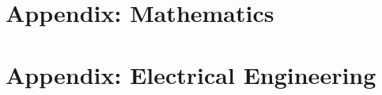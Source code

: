 \documentclass{article}
\newcommand{\LoadCheatsheet}[1]{{}}
\newcommand{\LoadAppendix}[1]{{}}
\begin{document}
    \LoadCheatsheet{symbols-and-units}

\newpage
{}

\section{Appendix: Mathematics}%
\label{sec:appendix-math}

    \LoadAppendix{mathematics}

\newpage
\section{Appendix: Electrical Engineering}%
\label{sec:appendix-ee}

    \LoadAppendix{electrical-engineering/inductors-and-inductive-coupling}
    \newpage
    \LoadAppendix{electrical-engineering/amplifier-analysis}
\end{document}
